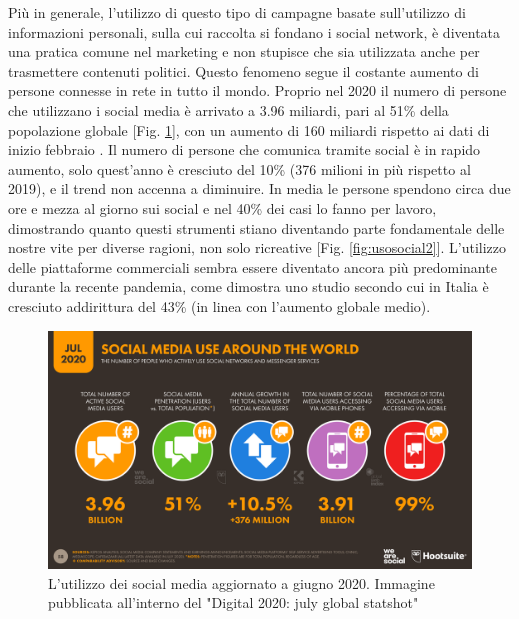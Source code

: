 Più in generale, l'utilizzo di questo tipo di campagne basate sull'utilizzo di informazioni personali, sulla cui raccolta si fondano i social network, è diventata una pratica comune nel marketing e non stupisce che sia utilizzata anche per trasmettere contenuti politici. Questo fenomeno segue il costante aumento di persone connesse in rete in tutto il mondo. Proprio nel 2020 il numero di persone che utilizzano i social media è arrivato a 3.96 miliardi, pari  al 51\% della popolazione globale \citep{kemp2020} [Fig. \ref{fig:usoSocial}], con un aumento di 160 miliardi rispetto ai dati di inizio febbraio \citep{kemp2}. Il numero di persone che comunica tramite social è in rapido aumento, solo quest'anno è cresciuto del 10\% (376 milioni in più rispetto al 2019), e il trend non accenna a diminuire. In media le persone spendono circa due ore e mezza al giorno sui social e nel 40\% dei casi lo fanno per lavoro,  dimostrando quanto questi strumenti stiano diventando parte fondamentale delle nostre vite per diverse ragioni, non solo ricreative [Fig. \ref{fig:usosocial2}].
L'utilizzo delle piattaforme commerciali sembra essere diventato ancora più predominante durante la recente pandemia, come dimostra uno studio \citep{gwi2020} secondo cui in Italia è cresciuto addirittura del 43\% (in linea con l'aumento globale medio).
\begin{figure}
	\includegraphics[width=\textwidth]{figures/social_media}
	\caption{L'utilizzo dei social media aggiornato a giugno 2020. Immagine pubblicata all'interno del "Digital 2020: july global statshot"}
	\label{fig:usoSocial}
\end{figure}


